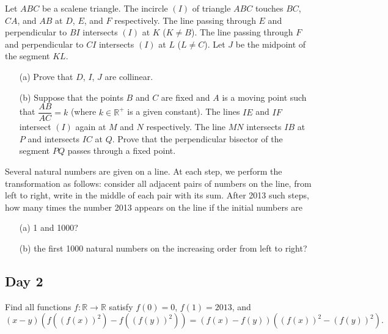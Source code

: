\documentclass[11pt]{article}
\begin{document}
        \boom
    
        \begin{exercise}
            Let \(ABC\) be a scalene triangle. The incircle \((I)\) of triangle \(ABC\) touches \(BC\), \(CA\), and \(AB\) at \(D\), \(E\), and \(F\) respectively. The line passing through \(E\) and perpendicular to \(BI\) intersects \((I)\) at \(K\) (\(K \neq B\)). The line passing through \(F\) and perpendicular to \(CI\) intersects \((I)\) at \(L\) (\(L \neq C\)). Let \(J\) be the midpoint of the segment \(KL\).
            \begin{enumerate}
                \item[(a)] Prove that \(D\), \(I\), \(J\) are collinear.
                \item[(b)] Suppose that the points \(B\) and \(C\) are fixed and \(A\) is a moving point such that \(\dfrac{AB}{AC} = k\) (where \(k \in \mathbb{R}^+\) is a given constant). The lines \(IE\) and \(IF\) intersect \((I)\) again at \(M\) and \(N\) respectively. The line \(MN\) intersects \(IB\) at \(P\) and intersects \(IC\) at \(Q\). Prove that the perpendicular bisector of the segment \(PQ\) passes through a fixed point.
            \end{enumerate}
        \end{exercise}
    
        \boom
    
        \begin{exercise}
            Several natural numbers are given on a line. At each step, we perform the transformation as follows: consider all adjacent pairs of numbers on the line, from left to right, write in the middle of each pair with its sum. After 2013 such steps, how many times the number 2013 appears on the line if the initial numbers are
            \begin{enumerate}
                \item[(a)] 1 and 1000?
                \item[(b)] the first 1000 natural numbers on the increasing order from left to right?
            \end{enumerate}
        \end{exercise}

    \newpage
    
    \subsection*{Day 2}

        \begin{exercise}
            Find all functions \(f: \mathbb{R} \to \mathbb{R}\) satisfy \(f(0) = 0\), \(f(1) = 2013\), and
            \[(x - y)\left(f\left(\left(f(x)\right)^2\right) - f\left(\left(f(y)\right)^2\right)\right) = \left(f(x) - f(y)\right)\left(\left(f(x)\right)^2 - \left(f(y)\right)^2\right).\]
        \end{exercise}
    
\end{document}
